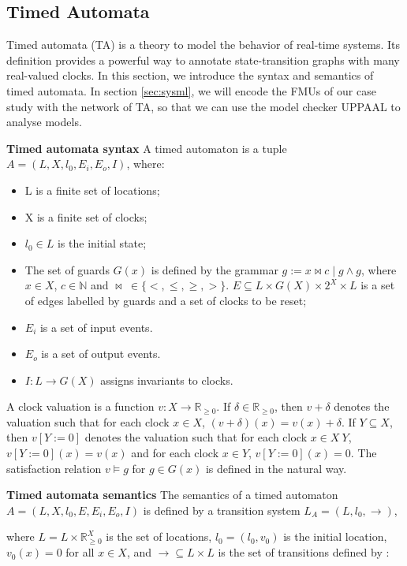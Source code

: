 \subsection{Timed Automata}
Timed automata (TA) \cite{BehrmannDLHPYH06} is a theory to model the behavior of real-time systems. Its definition provides a powerful way to annotate state-transition graphs with many real-valued clocks. In this section, we introduce the syntax and semantics of timed automata. In section \ref{sec:sysml}, we will encode the FMUs of our case study with the network of TA, so that we can use the model checker UPPAAL to analyse models.
\begin{definition}
\textbf{Timed automata syntax}
A timed automaton is a tuple $\textit{A}=(L,X,l_{0},E_{i},E_{o},I)$, where:
\end{definition}
\begin{itemize}
\item
L is a finite set of locations;
\item
X is a finite set of clocks;
\item
$l_{0} \in  L$ is the initial state;
\item
The set of guards $G(x)$ is defined by the grammar $g := x \bowtie c \mid g \land g$, where $x \in X$, $c \in \mathbb{N}$ and $\bowtie~\in \{<,\leqslant,\geqslant,>\}$. $E \subseteq L \times G(X) \times 2^X \times L$ is a set of edges labelled by guards and a set of clocks to be reset;
\item
$E_{i}$ is a set of input events.
\item
$E_{o}$ is a set of output events.
\item
$I : L \rightarrow G(X)$ assigns invariants to clocks.
\end{itemize}
A clock valuation is a function $v : X \rightarrow \mathbb{R}_{\geqslant{0}}$. If $\delta \in \mathbb{R}_{\geqslant{0}}$, then $v + \delta$ denotes the valuation such that for each clock $x \in X$, $(v + \delta)(x) = v(x) + \delta$. If $Y \subseteq X$, then $v[Y := 0]$ denotes the valuation such that for each clock $x \in X~Y$, $v[Y := 0](x) = v(x)$ and for each clock $x \in Y$, $v[Y := 0](x) = 0$. The satisfaction relation $v \models g$ for $g \in G(x)$ is defined in the natural way.
\begin{definition}
\textbf{Timed automata semantics} 
The semantics of a timed automaton $\textit{A} = (L,X,l_{0},E,E_{i},E_{o},I)$ is defined by a transition system $L_{\textit{A}} = (L,l_{0},\rightarrow)$, 
\end{definition}
where $L = L \times \mathbb{R}_{\geqslant{0}}^X$ is the set of locations, $l_{0} = (l_{0},v_{0})$ is the initial location, $v_{0}(x) = 0$ for all $x \in X$, and $\rightarrow \subseteq L \times L$ is the set of transitions defined by :
